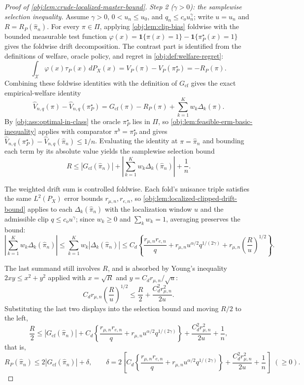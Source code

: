 \begin{proof}[Proof of \cref{obj:lem:crude-localized-master-bound}]
\emph{Step 2 (\(\gamma>0\)): the samplewise selection inequality.}  Assume \(\gamma>0\), \(0<u_n\le u_0\), and \(q_n\le c_ou_n^\gamma\); write \(u=u_n\) and \(R=R_P(\widehat\pi_n)\).  For every \(\pi\in\Pi\), applying \cref{obj:lem:clip-bias} foldwise with the bounded measurable test function \(\varphi(x)=\mathbf 1\{\pi(x)=1\}-\mathbf 1\{\pi^\star_P(x)=1\}\) gives the foldwise drift decomposition.  The contrast part is identified from the definitions of welfare, oracle policy, and regret in \cref{obj:def:welfare-regret}:
\[
\int_{\mathcal X}\varphi(x)\tau_P(x)\,dP_X(x)
=
V_P(\pi)-V_P(\pi^\star_P)
=
-R_P(\pi).
\]
Combining these foldwise identities with the definition of \(G_{\mathrm{cf}}\) gives the exact empirical-welfare identity
\[
\widehat V_{n,q}(\pi)-\widehat V_{n,q}(\pi^\star_P)
=
G_{\mathrm{cf}}(\pi)-R_P(\pi)+\sum_{k=1}^Kw_k\Delta_k(\pi).
\]
By \cref{obj:ass:optimal-in-class} the oracle \(\pi^\star_P\) lies in \(\Pi\), so \cref{obj:lem:feasible-erm-basic-inequality} applies with comparator \(\pi^b=\pi^\star_P\) and gives \(\widehat V_{n,q}(\pi^\star_P)-\widehat V_{n,q}(\widehat\pi_n)\le1/n\).  Evaluating the identity at \(\pi=\widehat\pi_n\) and bounding each term by its absolute value yields the samplewise selection bound
\[
R
\le
\left|G_{\mathrm{cf}}(\widehat\pi_n)\right|
+\left|\sum_{k=1}^Kw_k\Delta_k(\widehat\pi_n)\right|
+\frac1n .
\]

The weighted drift sum is controlled foldwise.  Each fold's nuisance triple satisfies the same \(L^2(P_X)\) error bounds \(r_{\mu,n},r_{e,n}\), so \cref{obj:lem:localized-clipped-drift-bound} applies to each \(\Delta_k(\widehat\pi_n)\) with the localization window \(u\) and the admissible clip \(q\le c_ou^\gamma\); since \(w_k\ge0\) and \(\sum_kw_k=1\), averaging preserves the bound:
\[
\left|\sum_{k=1}^Kw_k\Delta_k(\widehat\pi_n)\right|
\le
\sum_{k=1}^Kw_k\left|\Delta_k(\widehat\pi_n)\right|
\le
C_d\left\{
\frac{r_{\mu,n}r_{e,n}}q
+r_{\mu,n}u^{\alpha/2}q^{1/(2\gamma)}
+r_{\mu,n}\left(\frac{R}u\right)^{1/2}
\right\}.
\]

The last summand still involves \(R\), and is absorbed by Young's inequality \(2xy\le x^2+y^2\) applied with \(x=\sqrt R\) and \(y=C_dr_{\mu,n}/\sqrt u\):
\[
C_d r_{\mu,n}\left(\frac{R}u\right)^{1/2}
\le \frac{R}2+\frac{C_d^2r_{\mu,n}^2}{2u}.
\]
Substituting the last two displays into the selection bound and moving \(R/2\) to the left,
\[
\frac R2
\le
\left|G_{\mathrm{cf}}(\widehat\pi_n)\right|
+C_d\left\{\frac{r_{\mu,n}r_{e,n}}q+r_{\mu,n}u^{\alpha/2}q^{1/(2\gamma)}\right\}
+\frac{C_d^2r_{\mu,n}^2}{2u}
+\frac1n,
\]
that is,
\[
R_P(\widehat\pi_n)\le
2\left|G_{\mathrm{cf}}(\widehat\pi_n)\right|+\delta,
\qquad
\delta
=
2\left[
C_d\left\{\frac{r_{\mu,n}r_{e,n}}q
+r_{\mu,n}u^{\alpha/2}q^{1/(2\gamma)}\right\}
+\frac{C_d^2r_{\mu,n}^2}{2u}
+\frac1n
\right]\ \ (\ge0).
\]


\end{proof}
